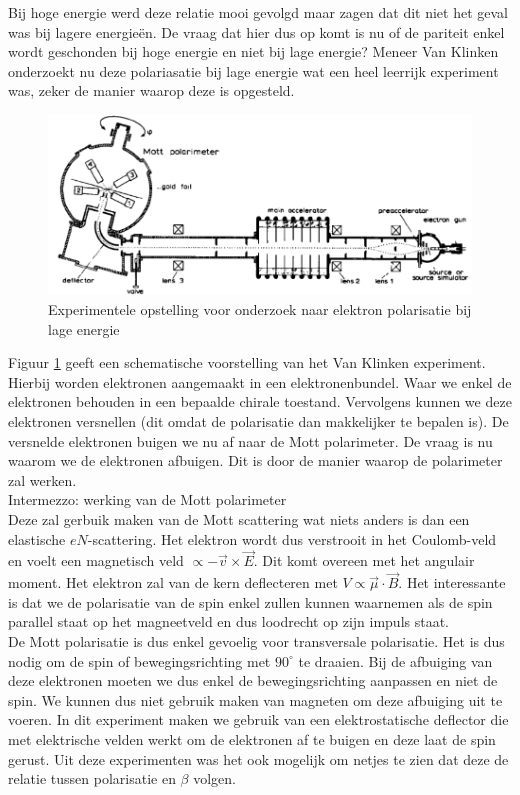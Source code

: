 \documentclass[../main.tex]{subfiles}
\begin{document}
Bij hoge energie werd deze relatie mooi gevolgd maar zagen dat dit niet het geval was bij lagere energieën. De vraag dat hier dus op komt is nu of de pariteit enkel wordt geschonden bij hoge energie en niet bij lage energie? Meneer Van Klinken onderzoekt nu deze polariasatie bij lage energie wat een heel leerrijk experiment was, zeker de manier waarop deze is opgesteld.

\begin{figure}[h]
    \centering
    \includegraphics[width=0.8\linewidth]{parity_violation/van_klinken.png}
    \caption{Experimentele opstelling voor onderzoek naar elektron polarisatie bij lage energie}%
    \label{fig:parity_violation/van_klinken}
\end{figure}

Figuur \ref{fig:parity_violation/van_klinken} geeft een schematische voorstelling van het Van Klinken experiment. Hierbij worden elektronen aangemaakt in een elektronenbundel. Waar we enkel de elektronen behouden in een bepaalde chirale toestand. Vervolgens kunnen we deze elektronen versnellen (dit omdat de polarisatie dan makkelijker te bepalen is). De versnelde elektronen buigen we nu af naar de Mott polarimeter. De vraag is nu waarom we de elektronen afbuigen. Dit is door de manier waarop de polarimeter zal werken.\\
{\color{blue} Intermezzo: werking van de Mott polarimeter\\
    Deze zal gerbuik maken van de Mott scattering wat niets anders is dan een elastische $eN$-scattering. Het elektron wordt dus verstrooit in het Coulomb-veld en voelt een magnetisch veld $\propto -\vec{v}\times \vec{E}$. Dit komt overeen met het angulair moment. Het elektron zal van de kern deflecteren met $V \propto \vec{\mu} \cdot \vec{B}$. Het interessante is dat we de polarisatie van de spin enkel zullen kunnen waarnemen als de spin parallel staat op het magneetveld en dus loodrecht op zijn impuls staat.\\
    De Mott polarisatie is dus enkel gevoelig voor transversale polarisatie. Het is dus nodig om de spin of bewegingsrichting met $90^\circ$ te draaien.
}
Bij de afbuiging van deze elektronen moeten we dus enkel de bewegingsrichting aanpassen en niet de spin. We kunnen dus niet gebruik maken van magneten om deze afbuiging uit te voeren. In dit experiment maken we gebruik van een elektrostatische deflector die met elektrische velden werkt om de elektronen af te buigen en deze laat de spin gerust. Uit deze experimenten was het ook mogelijk om netjes te zien dat deze de relatie tussen polarisatie en $\beta$ volgen.
\end{document}
